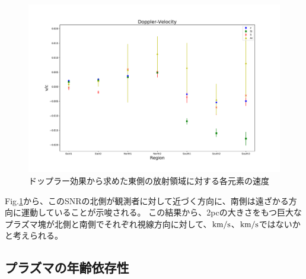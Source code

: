 \documentclass[a4j]{jarticle}%
\begin{document}
\begin{figure}[H]
\begin{center}
\includegraphics[scale=0.4]{./vel_lineofsight_1022.pdf}
\caption{ドップラー効果から求めた東側の放射領域に対する各元素の速度}
\label{fig:velo}
\end{center}
\end{figure}
Fig.\ref{fig:velo}から、このSNRの北側が観測者に対して近づく方向に、南側は遠ざかる方向に運動していることが示唆される。
この結果から、2pcの大きさをもつ巨大なプラズマ塊が北側と南側でそれぞれ視線方向に対して、$\rm{km/s}$、$\rm{km/s}$ではないかと考えられる。
  
\subsection{プラズマの年齢依存性}
\end{document}
